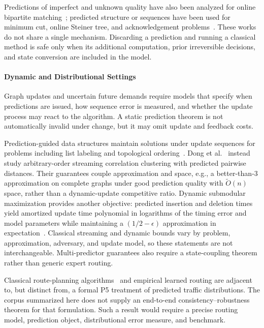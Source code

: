 \documentclass[acmsmall,screen,nonacm]{acmart}
\theoremstyle{acmdefinition}%
\begin{document}
Predictions of imperfect and unknown quality have also been analyzed for online bipartite matching~\cite{choo2024imperfect}; predicted structure or sequences have been used for minimum cut, online Steiner tree, and acknowledgement problems~\cite{moseley2025mincut,moseley2022steiner,im2023acknowledgement}. These works do not share a single mechanism. Discarding a prediction and running a classical method is safe only when its additional computation, prior irreversible decisions, and state conversion are included in the model.

\paragraph{Dynamic and Distributional Settings}
Graph updates and uncertain future demands require models that specify when predictions are issued, how sequence error is measured, and whether the update process may react to the algorithm. A static prediction theorem is not automatically invalid under change, but it may omit update and feedback costs.

Prediction-guided data structures maintain solutions under update sequences for problems including list labeling and topological ordering~\cite{mccauley2023listlabeling,mccauley2024topological}. Dong et al.~\cite{dong2025correlation} instead study arbitrary-order streaming correlation clustering with predicted pairwise distances. Their guarantees couple approximation and space, e.g., a better-than-$3$ approximation on complete graphs under good prediction quality with $\widetilde O(n)$ space, rather than a dynamic-update competitive ratio. Dynamic submodular maximization provides another objective: predicted insertion and deletion times yield amortized update time polynomial in logarithms of the timing error and model parameters while maintaining a $(1/2-\epsilon)$ approximation in expectation~\cite{agarwal2024submodular}. Classical streaming and dynamic bounds vary by problem, approximation, adversary, and update model, so these statements are not interchangeable. Multi-predictor guarantees also require a state-coupling theorem rather than generic expert routing.

Classical route-planning algorithms~\cite{bast2016route} and empirical learned routing are adjacent to, but distinct from, a formal P5 treatment of predicted traffic distributions. The corpus summarized here does not supply an end-to-end consistency--robustness theorem for that formulation. Such a result would require a precise routing model, prediction object, distributional error measure, and benchmark.
\end{document}

